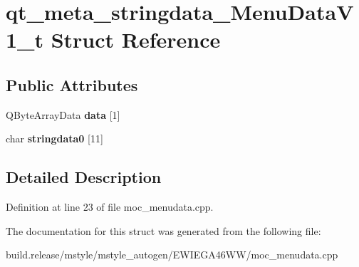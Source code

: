 \hypertarget{structqt__meta__stringdata___menu_data_v1__t}{}\section{qt\+\_\+meta\+\_\+stringdata\+\_\+\+Menu\+Data\+V1\+\_\+t Struct Reference}
\label{structqt__meta__stringdata___menu_data_v1__t}
\subsection*{Public Attributes}
\begin{DoxyCompactItemize}
\item 
\mbox{\label{structqt__meta__stringdata___menu_data_v1__t_a9beb5f7ff7fbc9ca4b2315726f45c900}} 
Q\+Byte\+Array\+Data {\bfseries data} \mbox{[}1\mbox{]}
\item 
\mbox{\label{structqt__meta__stringdata___menu_data_v1__t_a85b5dacb0edc6c4c8191126711b2e326}} 
char {\bfseries stringdata0} \mbox{[}11\mbox{]}
\end{DoxyCompactItemize}


\subsection{Detailed Description}


Definition at line 23 of file moc\+\_\+menudata.\+cpp.



The documentation for this struct was generated from the following file\+:\begin{DoxyCompactItemize}
\item 
build.\+release/mstyle/mstyle\+\_\+autogen/\+E\+W\+I\+E\+G\+A46\+W\+W/moc\+\_\+menudata.\+cpp\end{DoxyCompactItemize}
